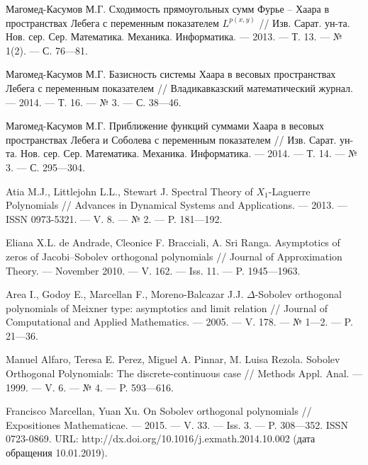 \begin{thebibliography}{111}
Магомед-Касумов М.Г. Сходимость	прямоугольных сумм Фурье -- Хаара в	пространствах Лебега с переменным показателем $L^{p(x,y)}$ // Изв. Сарат. ун-та. Нов. сер. Сер. Математика. Механика. Информатика. --- 2013. --- Т. 13. --- № 1(2). --- С. 76---81.






Магомед-Касумов М.Г. Базисность системы	Хаара в весовых пространствах Лебега с переменным показателем // Владикавказский 	математический журнал. --- 2014. --- Т. 16. --- № 3. --- С. 38---46.






Магомед-Касумов М.Г. Приближение функций суммами Хаара в весовых пространствах Лебега и Соболева с переменным показателем // Изв. Сарат. ун-та. Нов. сер.	Сер. Математика. Механика. Информатика. --- 2014. --- Т. 14. --- № 3. --- С. 295---304.






Atia M.J., Littlejohn L.L., Stewart J. Spectral Theory of $X_1$-Laguerre Polynomials // Advances in Dynamical Systems and Applications. --- 2013. --- ISSN 0973-5321. --- V. 8. --- № 2. --- P. 181---192.






Eliana X.L. de Andrade, Cleonice F. Bracciali, A. Sri Ranga. Asymptotics of zeros of Jacobi–Sobolev orthogonal polynomials // Journal of Approximation Theory. --- November 2010. --- V. 162. --- Iss. 11. --- P. 1945---1963.






Area I., Godoy E., Marcellan F., Moreno-Balcazar J.J. $\Delta$-Sobolev orthogonal polynomials of Meixner type: asymptotics and limit relation // Journal of Computational and Applied Mathematics. --- 2005. --- V. 178. --- № 1---2. --- P. 21---36.






Manuel Alfaro, Teresa E. Perez, Miguel A. Pinnar, M. Luisa Rezola. Sobolev Orthogonal Polynomials: The discrete-continuous case // Methods Appl. Anal. --- 1999. --- V. 6. --- № 4. --- P. 593---616.






Francisco Marcellan, Yuan Xu. On Sobolev orthogonal polynomials // Expositiones Mathematicae. --- 2015. --- V. 33. --- Iss. 3. --- P. 308---352. ISSN 0723-0869. URL: http://dx.doi.org/10.1016/j.exmath.2014.10.002 (дата обращения 10.01.2019).




\end{thebibliography}
